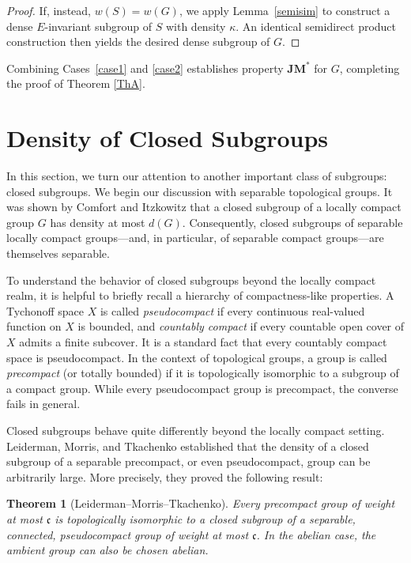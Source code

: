 \documentclass[12pt]{amsart}
\newtheorem{theorem}{Theorem}[section]
\theoremstyle{definition}
\numberwithin{equation}{section}
\theoremstyle{remark}
\def\JM{\mathbf{JM}}
\begin{document}
\begin{proof}
If, instead, $w(S) = w(G)$, we apply Lemma~\ref{semisim} to construct a dense $E$-invariant subgroup of $S$ with density $\kappa$. An identical semidirect product construction then yields the desired dense subgroup of $G$.
\end{proof}

Combining Cases~\ref{case1} and \ref{case2} establishes property $\JM^*$ for $G$, completing the proof of Theorem \ref{ThA}.




\section{Density of Closed Subgroups}\label{s3}

In this section, we turn our attention to another important class of subgroups: closed subgroups. We begin our discussion with separable topological groups. It was shown by Comfort and Itzkowitz \cite{CIt} that a closed subgroup of a locally compact group $G$ has density at most $d(G)$. Consequently, closed subgroups of separable locally compact groups---and, in particular, of separable compact groups---are themselves separable.

To understand the behavior of closed subgroups beyond the locally compact realm, it is helpful to briefly recall a hierarchy of compactness-like properties. A Tychonoff space $X$ is called \emph{pseudocompact} if every continuous real-valued function on $X$ is bounded, and \emph{countably compact} if every countable open cover of $X$ admits a finite subcover. It is a standard fact that every countably compact space is pseudocompact. In the context of topological groups, a group is called \emph{precompact} (or totally bounded) if it is topologically isomorphic to a subgroup of a compact group. While every pseudocompact group is precompact, the converse fails in general.



Closed subgroups behave quite differently beyond the locally compact setting. Leiderman, Morris, and Tkachenko \cite{LMT} established that the density of a closed subgroup of a separable precompact, or even pseudocompact, group can be arbitrarily large. More precisely, they proved the following result:

\begin{theorem}[Leiderman--Morris--Tkachenko]\label{thm_LMT}
Every precompact group of weight at most $\mathfrak{c}$ is topologically isomorphic to a closed subgroup of a separable, connected, pseudocompact group of weight at most $\mathfrak{c}$. In the abelian case, the ambient group can also be chosen abelian.
\end{theorem}
\end{document}
